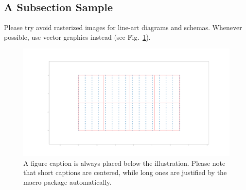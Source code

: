\documentclass{llncs}
\begin{document}
\subsection{A Subsection Sample}

Please \cite{Prajna04safetyverification} try \cite{BarryICRA2012} avoid rasterized images for line-art diagrams and
schemas. Whenever possible, use vector graphics instead (see
Fig.~\ref{fig1}).

\begin{figure}
\includegraphics[width=\textwidth]{./fig/batch_data}
\caption{A figure caption is always placed below the illustration.
Please note that short captions are centered, while long ones are
justified by the macro package automatically.} \label{fig1}
\end{figure}




\end{document}
